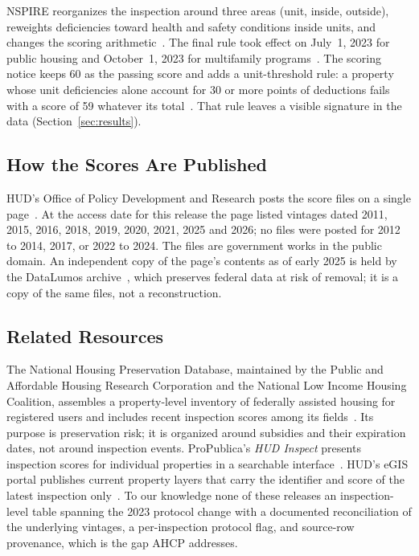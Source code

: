 \documentclass[10pt,twocolumn,letterpaper]{article}
\begin{document}
NSPIRE reorganizes the inspection around three areas (unit, inside, outside), reweights deficiencies toward health and safety conditions inside units, and changes the scoring arithmetic~\cite{nspirerule,nspirescoring}. The final rule took effect on July~1, 2023 for public housing and October~1, 2023 for multifamily programs~\cite{nspirerule}. The scoring notice keeps 60 as the passing score and adds a unit-threshold rule: a property whose unit deficiencies alone account for 30 or more points of deductions fails with a score of 59 whatever its total~\cite{nspirescoring}. That rule leaves a visible signature in the data (Section~\ref{sec:results}).

\subsection{How the Scores Are Published}
HUD's Office of Policy Development and Research posts the score files on a single page~\cite{hudpis}. At the access date for this release the page listed vintages dated 2011, 2015, 2016, 2018, 2019, 2020, 2021, 2025 and 2026; no files were posted for 2012 to 2014, 2017, or 2022 to 2024. The files are government works in the public domain. An independent copy of the page's contents as of early 2025 is held by the DataLumos archive~\cite{datalumos}, which preserves federal data at risk of removal; it is a copy of the same files, not a reconstruction.

\subsection{Related Resources}
The National Housing Preservation Database, maintained by the Public and Affordable Housing Research Corporation and the National Low Income Housing Coalition, assembles a property-level inventory of federally assisted housing for registered users and includes recent inspection scores among its fields~\cite{nhpd}. Its purpose is preservation risk; it is organized around subsidies and their expiration dates, not around inspection events. ProPublica's \emph{HUD Inspect} presents inspection scores for individual properties in a searchable interface~\cite{propublica}. HUD's eGIS portal publishes current property layers that carry the identifier and score of the latest inspection only~\cite{hudegis}. To our knowledge none of these releases an inspection-level table spanning the 2023 protocol change with a documented reconciliation of the underlying vintages, a per-inspection protocol flag, and source-row provenance, which is the gap AHCP addresses.
\end{document}
